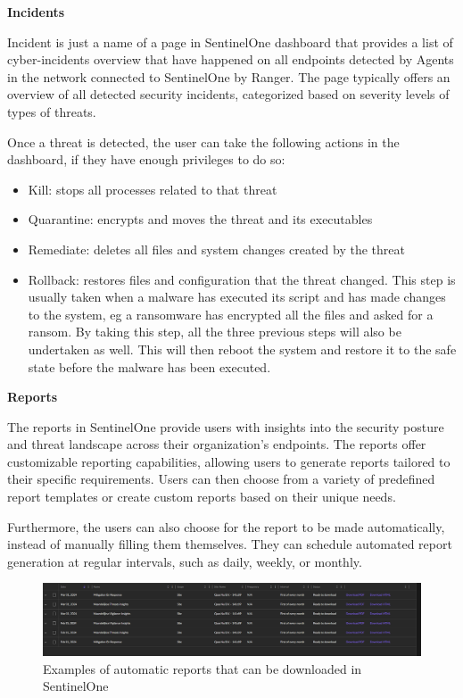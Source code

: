 \begin{multicols}{2}
      \textbf{Incidents}

      Incident is just a name of a page in SentinelOne dashboard that provides a list of cyber-incidents overview that have happened on all
      endpoints detected by Agents in the network connected to SentinelOne by Ranger. The page typically offers an overview of all detected
      security incidents, categorized based on severity levels of types of threats.

      Once a threat is detected, the user can take the following actions in the dashboard, if they have enough privileges
      to do so:
      \begin{itemize}
            \item Kill: stops all processes related to that threat
            \item Quarantine: encrypts and moves the threat and its executables
            \item Remediate: deletes all files and system changes created by the threat
            \item Rollback: restores files and configuration that the threat changed. This step is usually taken when a malware has
                  executed its script and has made changes to the system, \acrshort{eg} a ransomware has encrypted all the files and
                  asked for a ransom. By taking this step, all the three previous steps will also be undertaken as well. This will
                  then reboot the system and restore it to the safe state before the malware has been executed.
      \end{itemize}

      \textbf{Reports}

      The reports in SentinelOne provide users with insights into the security posture and threat landscape across their organization's
      endpoints. The reports offer customizable reporting capabilities, allowing users to generate reports tailored to their specific
      requirements. Users can then choose from a variety of predefined report templates or create custom reports based on their unique
      needs.

      Furthermore, the users can also choose for the report to be made automatically, instead of manually filling them themselves. They can
      schedule automated report generation at regular intervals, such as daily, weekly, or monthly.
\end{multicols}

\begin{figure}[htbp]
      \centering
      \includegraphics[width=1.0\textwidth]{Figures/SentinelOne/Reports.png}
      \caption{Examples of automatic reports that can be downloaded in SentinelOne}
      \label{fig:Reports}
\end{figure}

